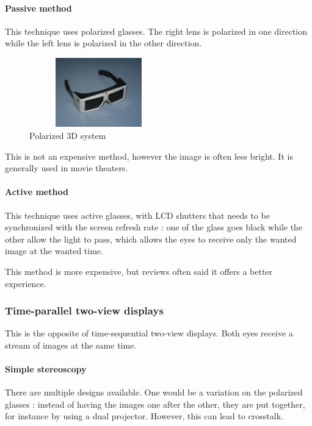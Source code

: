 \paragraph{Passive method}
This technique uses polarized glasses. The right lens is polarized in one direction while the left lens is polarized in the other direction. 

\begin{figure}[h!]
\begin{center}
\begin{minipage}{1\linewidth}
\centering\includegraphics[width=6cm,height=30mm]{image/2.jpg}
\caption{Polarized 3D system\cite{Polarized3D}}
\end{minipage}
\end{center}
\end{figure}

This is not an expensive method, however the image is often less bright. It is generally used in movie theaters.

\paragraph{Active method}
This technique uses active glasses, with LCD shutters that needs to be synchronized with the screen refresh rate : one of the glass goes black while the other allow the light to pass, which allows the eyes to receive only the wanted image at the wanted time.

This method is more expensive, but reviews often said it offers a better experience.

\subsubsection{Time-parallel two-view displays}
This is the opposite of time-sequential two-view displays. Both eyes receive a stream of images at the same time.

\paragraph{Simple stereoscopy}
There are multiple designs available. One would be a variation on the polarized glasses : instead of having the images one after the other, they are put together, for instance by using a dual projector. However, this can lead to crosstalk.

